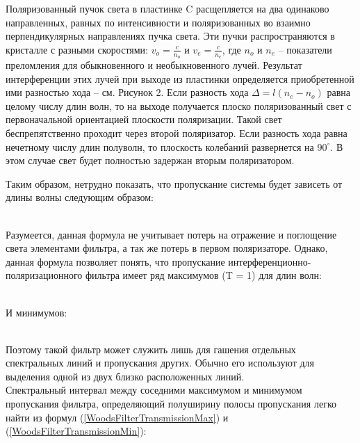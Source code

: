 Поляризованный пучок света в пластинке C расщепляется на два одинаково направленных, равных
по интенсивности и поляризованных во взаимно перпендикулярных направлениях пучка света.
Эти пучки распространяются в кристалле с разными скоростями: $ v_o = \frac{c}{n_o} $ и
$ v_e = \frac{c}{n_e} $, где $ n_o $ и $ n_e $ -- показатели преломления для обыкновенного
и необыкновенного лучей. Результат интерференции этих лучей при выходе из пластинки
определяется приобретенной ими разностью хода -- см. Рисунок 2. Если разность хода
$ \Delta = l\left( n_e - n_o \right) $ равна целому числу длин волн, то на выходе получается
плоско поляризованный свет с первоначальной ориентацией плоскости поляризации. Такой свет
беспрепятственно проходит через второй поляризатор. Если разность хода равна нечетному числу
длин полуволн, то плоскость колебаний развернется на $ 90^\circ $. В этом случае свет будет
полностью задержан вторым поляризатором. \\ [0.3cm]


\newpage

Таким образом, нетрудно показать, что пропускание системы будет зависеть от длины волны
следующим образом:

 \\

Разумеется, данная формула не учитывает потерь на отражение и поглощение света элементами
фильтра, а так же потерь в первом поляризаторе. Однако, данная формула позволяет понять,
что пропускание интерференционно-поляризационного фильтра имеет ряд максимумов (T = 1)
для длин волн:

 \\

И минимумов:

 \\

Поэтому такой фильтр может служить лишь для гашения отдельных спектральных линий и
пропускания других. Обычно его используют для выделения одной из двух близко расположенных
линий. \\

Спектральный интервал между соседними максимумом и минимумом пропускания фильтра,
определяющий полуширину полосы пропускания легко найти из формул
(\ref{WoodsFilterTransmissionMax}) и (\ref{WoodsFilterTransmissionMin}):

